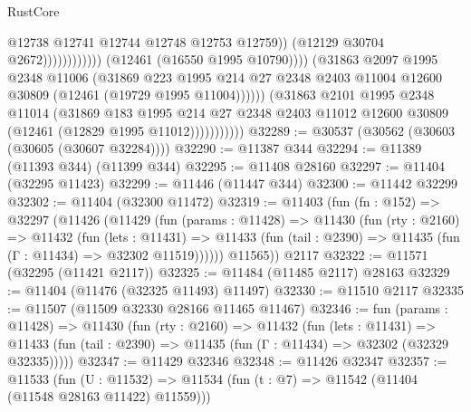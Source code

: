 \begin{lexlean}{RustCore}
\begin{coremodule}
                                                    @12738
                                                    @12741
                                                    @12744
                                                    @12748
                                                    @12753
                                                    @12759))
                                                (@12129 @30704 @2672))))))))))))
                          (@12461 (@16550 @1995 @10790))))
                      (@31863
                        @2097
                        @1995
                        @2348
                        @11006
                        (@31869
                          @223
                          @1995
                          @214
                          @27
                          @2348
                          @2403
                          @11004
                          @12600
                          @30809
                          (@12461 (@19729 @1995 @11004))))))
                  (@31863
                    @2101
                    @1995
                    @2348
                    @11014
                    (@31869
                      @183
                      @1995
                      @214
                      @27
                      @2348
                      @2403
                      @11012
                      @12600
                      @30809
                      (@12461 (@12829 @1995 @11012)))))))))))
@32289 := @30537 (@30562 (@30603 (@30605 (@30607 @32284))))
@32290 := @11387 @344
@32294 := @11389 (@11393 @344) (@11399 @344)
@32295 := @11408 @28160
@32297 := @11404 (@32295 @11423)
@32299 := @11446 (@11447 @344)
@32300 := @11442 @32299
@32302 := @11404 (@32300 @11472)
@32319 := @11403
    (fun (fn : @152) =>
    @32297
      (@11426
        (@11429
          (fun (params : @11428) =>
          @11430
            (fun (rty : @2160) =>
            @11432
              (fun (lets : @11431) =>
              @11433 (fun (tail : @2390) => @11435 (fun (Γ : @11434) => @32302 @11519))))))
        @11565))
    @2117
@32322 := @11571 (@32295 (@11421 @2117))
@32325 := @11484 (@11485 @2117) @28163
@32329 := @11404 (@11476 (@32325 @11493) @11497)
@32330 := @11510 @2117
@32335 := @11507 (@11509 @32330 @28166 @11465 @11467)
@32346 := fun (params : @11428) =>
  @11430
    (fun (rty : @2160) =>
    @11432
      (fun (lets : @11431) =>
      @11433 (fun (tail : @2390) => @11435 (fun (Γ : @11434) => @32302 (@32329 @32335)))))
@32347 := @11429 @32346
@32348 := @11426 @32347
@32357 := @11533
    (fun (U : @11532) => @11534 (fun (t : @7) => @11542 (@11404 (@11548 @28163 @11422) @11559)))

\end{coremodule}
\end{lexlean}
